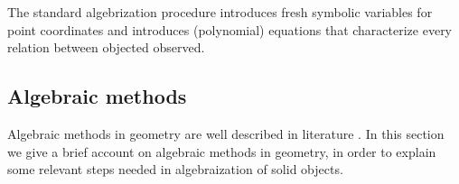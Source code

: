 \documentclass[final,1p,times,authoryear]{elsarticle}
\begin{document}
The standard algebrization procedure introduces fresh symbolic
variables for point coordinates and introduces (polynomial) equations
that characterize every relation between objected observed.

\begin{comment}
Each object can be given independently by adding its arbitrary
parameters or it can be given using relationship with other, already
introduced objects. In the second case, for each new object both the
parameters and the polynomials that represent relationship between new
object and other objects in the construction are
introduced. Polynomials contain parameters of all objects in the
construction rule and analytic identities. All polynomials are
recorded in construction set which is later used in GeoProver.

Beside construction rules, there are statement rules, rules used to
express some condition that can be check using GeoProver. For each of
these conditions are created polynomials which are recorded in the
statement set. Although in most of the cases, there is only one
statement polynomial, there were couple statement that generated more
than one. As mentioned earlier, GeoProver can only have one statement
rule. However, this not pose a problem, since for each polynomial in
the statement set GeoProver was applied (always using the same
construction set). The statement is considered to be true only if
GeoProver returned true for all polynomials in the statement set.

For the purpose of the further text we are going to assume that we
have all the necessary data for each construction or statement rule
(our system collects this data, but we are not going to explain
technical side of the system since we fill this is not the scope of
this paper). This means that we have all the parameters of already
given objects.
\end{comment}

\subsection{Algebraic methods}

Algebraic methods in geometry are well described in literature
\cite{}.  In this section we give a brief account on algebraic methods
in geometry, in order to explain some relevant steps needed in
algebraization of solid objects. 
\end{document}
